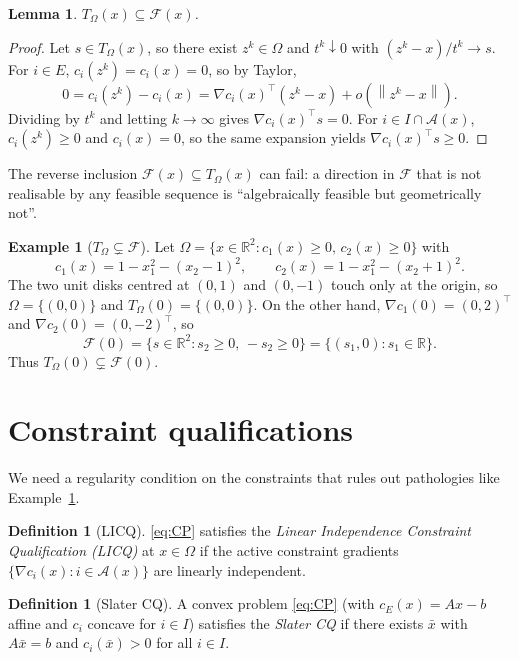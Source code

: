 \documentclass[11pt,a4paper]{report}
\theoremstyle{plain}
\newtheorem{lemma}[theorem]{Lemma}
\theoremstyle{definition}
\newtheorem{definition}[theorem]{Definition}
\newtheorem{example}[theorem]{Example}
\newcommand{\R}{\mathbb{R}}
\newcommand{\norm}[1]{\left\lVert#1\right\rVert}
\newcommand{\grad}{\nabla}
\newcommand{\trans}{^{\top}}
\begin{document}
\begin{lemma}\label{lem:TF}
$T_{\Omega}(x)\subseteq\mathcal{F}(x)$.
\end{lemma}
\begin{proof}
Let $s\in T_{\Omega}(x)$, so there exist $z^{k}\in\Omega$ and $t^{k}\downarrow 0$
with $(z^{k}-x)/t^{k}\to s$. For $i\in E$, $c_{i}(z^{k})=c_{i}(x)=0$, so by
Taylor,
\[
0=c_{i}(z^{k})-c_{i}(x)=\grad c_{i}(x)\trans(z^{k}-x)+o\left(\norm{z^{k}-x}\right).
\]
Dividing by $t^{k}$ and letting $k\to\infty$ gives $\grad c_{i}(x)\trans s=0$.
For $i\in I\cap\mathcal{A}(x)$, $c_{i}(z^{k})\ge 0$ and $c_{i}(x)=0$, so the
same expansion yields $\grad c_{i}(x)\trans s\ge 0$.
\end{proof}

The reverse inclusion $\mathcal{F}(x)\subseteq T_{\Omega}(x)$ can fail: a
direction in $\mathcal{F}$ that is not realisable by any feasible sequence is
``algebraically feasible but geometrically not''.

\begin{example}[$T_{\Omega}\subsetneq\mathcal{F}$]\label{ex:CQ-fail}
Let $\Omega=\{x\in\R^{2}:c_{1}(x)\ge 0,\,c_{2}(x)\ge 0\}$ with
\[
c_{1}(x)=1-x_{1}^{2}-(x_{2}-1)^{2},\qquad
c_{2}(x)=1-x_{1}^{2}-(x_{2}+1)^{2}.
\]
The two unit disks centred at $(0,1)$ and $(0,-1)$ touch only at the origin,
so $\Omega=\{(0,0)\}$ and $T_{\Omega}(0)=\{(0,0)\}$. On the other hand,
$\grad c_{1}(0)=(0,2)\trans$ and $\grad c_{2}(0)=(0,-2)\trans$, so
\[
\mathcal{F}(0)=\{s\in\R^{2}:s_{2}\ge 0,\,-s_{2}\ge 0\}=\{(s_{1},0):s_{1}\in\R\}.
\]
Thus $T_{\Omega}(0)\subsetneq\mathcal{F}(0)$.
\end{example}

\section{Constraint qualifications}

We need a regularity condition on the constraints that rules out pathologies
like Example~\ref{ex:CQ-fail}.

\begin{definition}[LICQ]
\eqref{eq:CP} satisfies the \emph{Linear Independence Constraint Qualification
(LICQ)} at $x\in\Omega$ if the active constraint gradients
$\{\grad c_{i}(x):i\in\mathcal{A}(x)\}$ are linearly independent.
\end{definition}

\begin{definition}[Slater CQ]
A convex problem \eqref{eq:CP} (with $c_{E}(x)=Ax-b$ affine and $c_{i}$ concave
for $i\in I$) satisfies the \emph{Slater CQ} if there exists $\bar{x}$ with
$A\bar{x}=b$ and $c_{i}(\bar{x})>0$ for all $i\in I$.
\end{definition}
\end{document}
